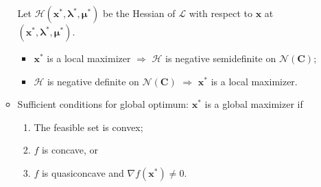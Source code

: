 \documentclass[%
 aip,
 jmp,%
 amsmath,amssymb,
 reprint,%
]{revtex4-1}
\renewcommand{\vec}[1]{\bm{#1}}
\newcommand{\mat}[1]{\bm{#1}}
\renewcommand{\L}{\mathcal{L}}       %
\newcommand{\HL}{\bm{\mathcal{H}}}   %
\newcommand{\N}{\mathcal{N}}    %
\begin{document}
\begin{enumerate}
\begin{itemize}[leftmargin=*]
            Let $\HL(\vec{x}^*, \vec{\lambda}^*, \vec{\mu}^*)$ be the Hessian of $\L$ with respect to $\vec{x}$ at
            $(\vec{x}^*, \vec{\lambda}^*, \vec{\mu}^*)$.

                \begin{itemize}[leftmargin=*]
                    \item $\vec{x}^*$ is a local maximizer $\Rightarrow$ $\HL$ is negative semidefinite on $\N(\mat{C})$;
                    \item $\HL$ is negative definite on $\N(\mat{C})$ $\Rightarrow$ $\vec{x}^*$ is a local maximizer.
                \end{itemize}

            \item Sufficient conditions for global optimum: $\vec{x}^*$ is a global maximizer if
                \begin{enumerate}
                    \item The feasible set is convex;
                    \item $f$ is concave, or
                    \item $f$ is quasiconcave and $\nabla f(\vec{x}^*) \neq 0$.
                \end{enumerate}
        \end{itemize}


\end{enumerate}
\end{document}
